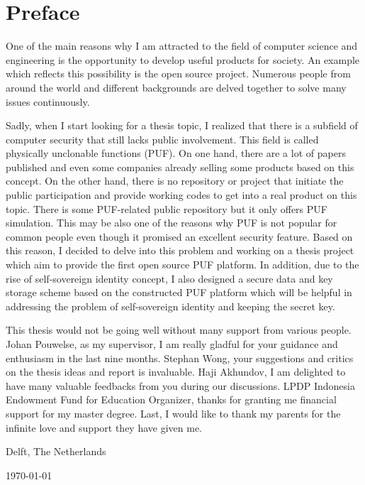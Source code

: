\chapter*{Preface}
One of the main reasons why I am attracted to the field of computer science and engineering is the opportunity to develop useful products for society. An example which reflects this possibility is the open source project. Numerous people from around the world and different backgrounds are delved together to solve many issues continuously.

Sadly, when I start looking for a thesis topic, I realized that there is a subfield of computer security that still lacks public involvement. This field is called physically unclonable functions (PUF). On one hand, there are a lot of papers published and even some companies already selling some products based on this concept. On the other hand, there is no repository or project that initiate the public participation and provide working codes to get into a real product on this topic. There is some PUF-related public repository but it only offers PUF simulation. This may be also one of the reasons why PUF is not popular for common people even though it promised an excellent security feature. Based on this reason, I decided to delve into this problem and working on a thesis project which aim to provide the first open source PUF platform. In addition, due to the rise of self-sovereign identity concept, I also designed a secure data and key storage scheme based on the constructed PUF platform which will be helpful in addressing the problem of self-sovereign identity and keeping the secret key.
\vspace{1\baselineskip}

\noindent
This thesis would not be going well without many support from various people. Johan Pouwelse, as my supervisor, I am really gladful for your guidance and enthusiasm in the last nine months.  Stephan Wong, your suggestions and critics on the thesis ideas and report is invaluable. Haji Akhundov, I am delighted to have many valuable feedbacks from you during our discussions.
LPDP Indonesia Endowment Fund for Education Organizer, thanks for granting me financial support for my master degree. Last, I would like to thank my parents for the infinite love and support they have given me.

\vspace{1\baselineskip}

\noindent
\reportAuthor

\vspace{1\baselineskip}

\noindent
Delft, The Netherlands

\noindent
\today
